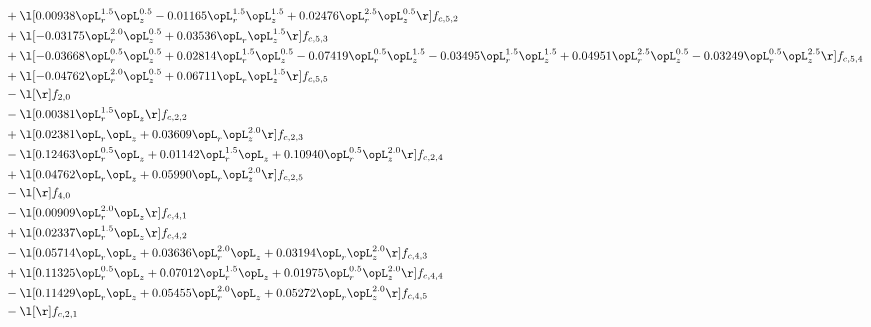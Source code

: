 \begin{alignat}{2}
& + \l[  0.00938 \opL_r^{1.5} \opL_z^{0.5}   -0.01165 \opL_r^{1.5} \opL_z^{1.5} +  0.02476 \opL_r^{2.5} \opL_z^{0.5}  \r] f_{c,5,2} \nonumber \\ 
& + \l[  -0.03175 \opL_r^{2.0} \opL_z^{0.5} +  0.03536 \opL_r \opL_z^{1.5}  \r] f_{c,5,3} \nonumber \\ 
& + \l[  -0.03668 \opL_r^{0.5} \opL_z^{0.5} +  0.02814 \opL_r^{1.5} \opL_z^{0.5}   -0.07419 \opL_r^{0.5} \opL_z^{1.5}   -0.03495 \opL_r^{1.5} \opL_z^{1.5} +  0.04951 \opL_r^{2.5} \opL_z^{0.5}   -0.03249 \opL_r^{0.5} \opL_z^{2.5}  \r] f_{c,5,4} \nonumber \\ 
& + \l[  -0.04762 \opL_r^{2.0} \opL_z^{0.5} +  0.06711 \opL_r \opL_z^{1.5}  \r] f_{c,5,5} \nonumber \\ 
& - \l[  \r] f_{2,0} \nonumber \\ 
& - \l[  0.00381 \opL_r^{1.5} \opL_z  \r] f_{c,2,2} \nonumber \\ 
& + \l[  0.02381 \opL_r \opL_z +  0.03609 \opL_r \opL_z^{2.0}  \r] f_{c,2,3} \nonumber \\ 
& - \l[  0.12463 \opL_r^{0.5} \opL_z +  0.01142 \opL_r^{1.5} \opL_z +  0.10940 \opL_r^{0.5} \opL_z^{2.0}  \r] f_{c,2,4} \nonumber \\ 
& + \l[  0.04762 \opL_r \opL_z +  0.05990 \opL_r \opL_z^{2.0}  \r] f_{c,2,5} \nonumber \\ 
& - \l[  \r] f_{4,0} \nonumber \\ 
& - \l[  0.00909 \opL_r^{2.0} \opL_z  \r] f_{c,4,1} \nonumber \\ 
& + \l[  0.02337 \opL_r^{1.5} \opL_z  \r] f_{c,4,2} \nonumber \\ 
& - \l[  0.05714 \opL_r \opL_z +  0.03636 \opL_r^{2.0} \opL_z +  0.03194 \opL_r \opL_z^{2.0}  \r] f_{c,4,3} \nonumber \\ 
& + \l[  0.11325 \opL_r^{0.5} \opL_z +  0.07012 \opL_r^{1.5} \opL_z +  0.01975 \opL_r^{0.5} \opL_z^{2.0}  \r] f_{c,4,4} \nonumber \\ 
& - \l[  0.11429 \opL_r \opL_z +  0.05455 \opL_r^{2.0} \opL_z +  0.05272 \opL_r \opL_z^{2.0}  \r] f_{c,4,5} \nonumber \\ 
& - \l[  \r] f_{c,2,1} \nonumber \\ 
\end{alignat} 


